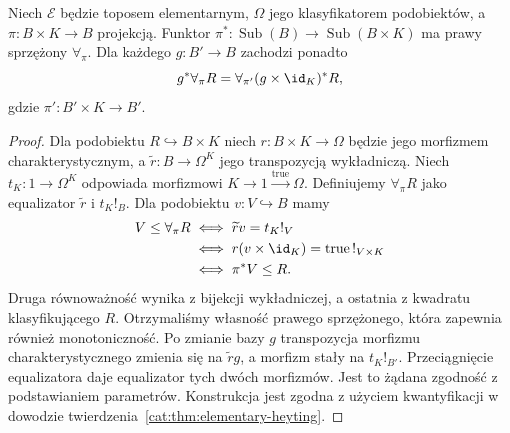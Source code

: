 \begin{twierdzenie}\label{cat:thm:cl-forall-projection}
Niech $\mathcal E$ będzie toposem elementarnym, $\Omega$ jego klasyfikatorem podobiektów, a $\pi:B\times K\to B$ projekcją. Funktor $\pi^*:\operatorname{Sub}(B)\to\operatorname{Sub}(B\times K)$ ma prawy sprzężony $\forall_\pi$. Dla każdego $g:B'\to B$ zachodzi ponadto
\[
 g^*\forall_\pi R=\forall_{\pi'}(g\times\id_K)^*R,
\]
gdzie $\pi':B'\times K\to B'$.
\end{twierdzenie}
\begin{proof}
Dla podobiektu $R\hookrightarrow B\times K$ niech $r:B\times K\to\Omega$ będzie jego morfizmem charakterystycznym, a $\widetilde r:B\to\Omega^K$ jego transpozycją wykładniczą. Niech $t_K:1\to\Omega^K$ odpowiada morfizmowi $K\to1\xrightarrow{\mathrm{true}}\Omega$. Definiujemy $\forall_\pi R$ jako equalizator $\widetilde r$ i $t_K!_B$. Dla podobiektu $v:V\hookrightarrow B$ mamy
\[
\begin{aligned}
 V\leq\forall_\pi R
 &\iff\widetilde r v=t_K!_V\\
 &\iff r(v\times\id_K)=\mathrm{true}\,!_{V\times K}\\
 &\iff \pi^*V\leq R.
\end{aligned}
\]
Druga równoważność wynika z bijekcji wykładniczej, a ostatnia z kwadratu klasyfikującego $R$. Otrzymaliśmy własność prawego sprzężonego, która zapewnia również monotoniczność. Po zmianie bazy $g$ transpozycja morfizmu charakterystycznego zmienia się na $\widetilde r g$, a morfizm stały na $t_K!_{B'}$. Przeciągnięcie equalizatora daje equalizator tych dwóch morfizmów. Jest to żądana zgodność z podstawianiem parametrów. Konstrukcja jest zgodna z użyciem kwantyfikacji w dowodzie twierdzenia~\ref{cat:thm:elementary-heyting}.
\end{proof}

